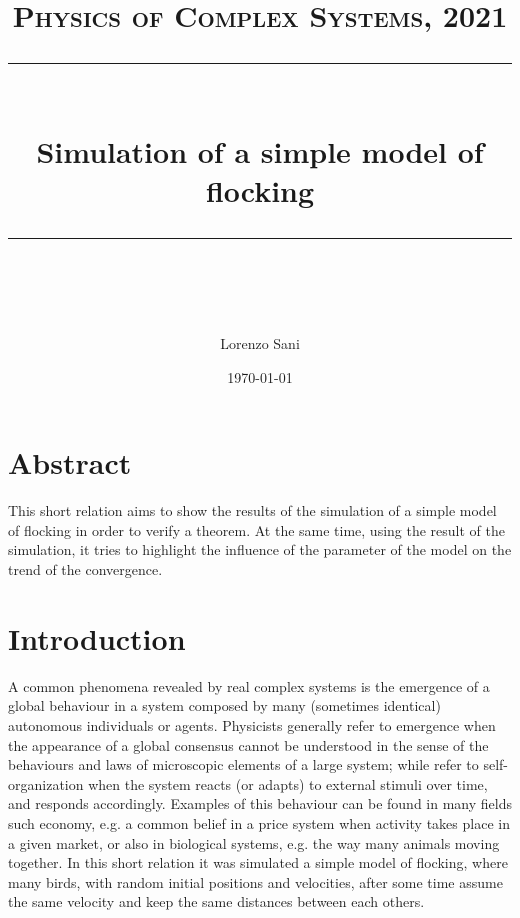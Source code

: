 \documentclass{article} %
\title{
\normalfont \normalsize 
\textsc{Physics of Complex Systems, 2021} \\ 
[10pt] 
\rule{\linewidth}{0.5pt} \\[6pt] 
\huge 
Simulation of a simple model of flocking
\rule{\linewidth}{2pt}  \\[10pt]
}
\author{Lorenzo Sani}
\date{\normalsize \today}
\newcounter{other}
\newcounter{late}
\begin{document}
\maketitle

\tableofcontents

\section{Abstract}
This short relation aims to show the results of the simulation of a simple model of flocking
in order to verify a theorem. At the same time, using the result of the simulation, it tries
to highlight the influence of the parameter of the model on the trend of the convergence.
\section{Introduction}
A common phenomena revealed by real complex systems is the emergence of a global 
behaviour in a system composed by many (sometimes identical) autonomous individuals or 
agents.
Physicists generally refer to emergence when the appearance of a global consensus cannot
be understood in the sense of the behaviours and laws of microscopic elements of a large
system; while refer to self-organization when the system reacts (or adapts) to external 
stimuli over time, and responds accordingly.
Examples of this behaviour can be found in many fields such economy, e.g. a 
common belief in a price system when activity takes place in a given market, or also
in biological systems, e.g. the way many animals moving together.
In this short relation it was simulated a simple model of flocking, where many birds,
with random initial positions and velocities, after some time assume the same velocity
and keep the same distances between each others.
\end{document}
